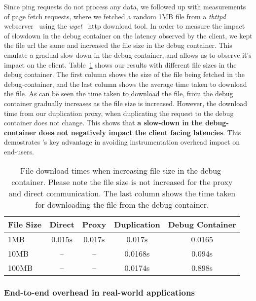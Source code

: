 Since ping requests do not process any data,
we followed up with measurements of page fetch requests, where we fetched a random 1MB file from a \emph{thttpd} webserver~\cite{thttpd} using the \emph{wget}~\cite{wget} http download tool.
In order to measure the impact of slowdown in the debug container on the latency observed by the client, 
we kept the file url the same and increased the file size in the debug container. This emulate a gradual slow-down in the debug-container, and allows us to observe it's impact on the client.
Table~\ref{tab:increasedSize} shows our results with different file sizes in the debug container.
The first column shows the size of the file being fetched in the debug-container, and the last column shows the average time taken to download the file.
As can be seen the time taken to download the file, from the debug container gradually increases as the file size is increased.
However, the download time from our duplication proxy, when duplicating the request to the debug container does not change.
This shows that \textbf{a slow-down in the debug-container does not negatively impact the client facing latencies}.
This demostrates \parikshan's key advantage in avoiding instrumentation overhead impact on end-users.  

\begin{table}
\centering
\begin{center}
	\begin{tabular}{l c c c c}
	\toprule
	\textbf{File Size} & \textbf{Direct} & \textbf{Proxy} & \textbf{Duplication} & \textbf{Debug Container} \\
	\midrule
	1MB & 0.015s & 0.017s & 0.017s & 0.0165 \\
	10MB & -- & -- & 0.0168s & 0.094s\\
	100MB & -- & -- & 0.0174s & 0.898s\\
	\bottomrule
	\end{tabular}
\end{center}
\caption{File download times when increasing file size in the debug-container. Please note the file size is not increased for the proxy and direct communication. The last column shows the time taken for downloading the file from the debug container.}
\label{tab:increasedSize}
\end{table}
 


\subsubsection{End-to-end overhead in real-world applications}
\label{sec:end2endEval}

